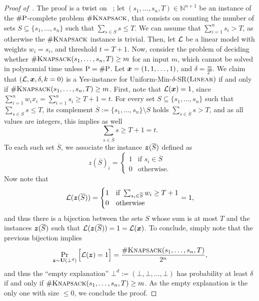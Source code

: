 \subsection{}
\begin{proof}[Proof of~]
    The proof is a twist on ~\citet[Lemma 28]{NEURIPS2020_b1adda14}; let $(s_1, \ldots, s_n, T) \in \mathbb{N}^{n+1}$ be an instance of the $\# \mathrm{P}$-complete problem $\#\textsc{Knapsack}$, that consists on counting the number of sets $S \subseteq \{s_1, \ldots, s_n\}$ such that $\sum_{s \in S}s \leq T$.  
    We can assume that $\sum_{i=1}^n s_i > T$, as otherwise the $\# \textsc{Knapsack}$ instance is trivial.
    Then, let $\mathcal{L}$ be a linear model with weights $w_i = s_i$, and threshold $t = T+1$.
    Now, consider the problem of deciding whether $\#\textsc{Knapsack}(s_1, \ldots, s_n, T) \geq m$ for an input $m$, which cannot be solved in polynomial time unless $\mathrm{P} = \# \mathrm{P}$.
    Let ${\bm{x}} = (1, 1, \ldots, 1)$, and $\delta = \frac{m}{2^{n}}$. We claim that $(\mathcal{L}, {\bm{x}}, \delta, k=0)$ is a Yes-instance for Uniform-Min-$\delta$-SR$(\textsc{Linear})$ if and only if $\#\textsc{Knapsack}(s_1, \ldots, s_n, T) \geq m$. 
    First, note that $\mathcal{L}({\bm{x}}) = 1$, since $\sum_{i=1}^n w_i x_i = \sum_{i=1}^n s_i \geq T+1 = t$. 
    For every set $S \subseteq \{s_1, \ldots, s_n\}$ such that $\sum_{s \in S}s \leq T$, its complement $\overline{S} := \{s_1, \ldots, s_n\} \setminus S$ holds $\sum_{s \in \overline{S}}s > T$, and as all values are integers, this implies as well
    \[
        \sum_{s \in \overline{S}} s \geq T+1 = t.
    \]
    To each such set $\overline{S}$, we associate the instance ${\bm{z}}(\overline{S})$ defined as
    \[
        z(\overline{S})_i = \begin{cases}
            1 & \text{if } s_i \in \overline{S}\\
            0 & \text{otherwise}.
        \end{cases}
    \]
    Now note that 
    \[
        \mathcal{L}({\bm{z}}(\overline{S})) = \begin{cases}
            1 & \text{if } \sum_{s_i \in \overline{S}} w_i \geq T+1\\
            0 & \text{otherwise} \end{cases} = 1,
    \]
    and thus there is a bijection between the sets $S$ whose sum is at most $T$ and the instances ${\bm{z}}(\overline{S})$ such that $\mathcal{L}({\bm{z}}(\overline{S})) = 1 = \mathcal{L}({\bm{x}})$.
    To conclude, simply note that the previous bijection implies
    \[
        \Pr_{{\bm{z}} \sim \mathbf{U}(\bot^d)}\Big[\mathcal{L}({\bm{z}}) = 1\Big] = \frac{\#\textsc{Knapsack}(s_1, \ldots, s_n, T)}{2^n},
    \] 
    and thus the ``empty explanation'' $\bot^d := (\bot, \bot, \ldots, \bot)$ has probability at least $\delta$ if and only if $\#\textsc{Knapsack}(s_1, \ldots, s_n, T) \geq m$. As the empty explanation is the only one with size $\leq 0$, we conclude the proof.
    


\end{proof}
